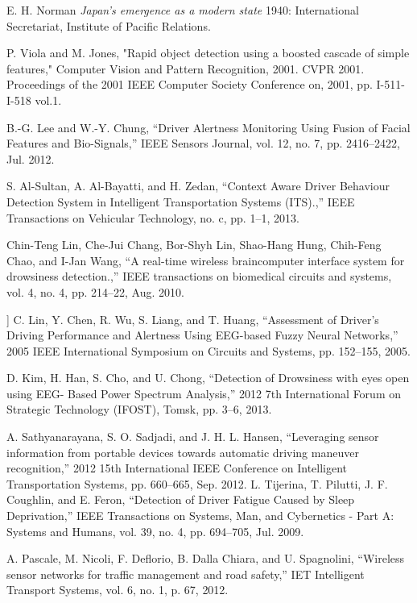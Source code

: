 \documentclass[twocolumn]{article}
\begin{document}
\begin{thebibliography}{1}

   E. H. Norman {\em Japan's emergence as a modern
  state} 1940: International Secretariat, Institute of Pacific
  Relations.

  P. Viola and M. Jones, "Rapid object detection using a boosted cascade of simple features," Computer Vision and Pattern Recognition, 2001. CVPR 2001. Proceedings of the 2001 IEEE Computer Society Conference on, 2001, pp. I-511-I-518 vol.1.
  
   B.-G. Lee and W.-Y. Chung, “Driver Alertness Monitoring Using Fusion of Facial Features and Bio-Signals,” IEEE Sensors Journal, vol. 12, no. 7, pp. 2416–2422, Jul. 2012.
  
   S. Al-Sultan, A. Al-Bayatti, and H. Zedan, “Context Aware Driver Behaviour Detection System in Intelligent Transportation Systems (ITS).,” IEEE Transactions on Vehicular Technology, no. c, pp. 1–1, 2013.

    Chin-Teng Lin, Che-Jui Chang, Bor-Shyh Lin, Shao-Hang Hung, Chih-Feng Chao, and I-Jan Wang, “A real-time wireless braincomputer interface system for drowsiness detection.,” IEEE transactions on biomedical circuits and systems, vol. 4, no. 4, pp. 214–22, Aug. 2010.

	 ] C. Lin, Y. Chen, R. Wu, S. Liang, and T. Huang, “Assessment of Driver’s Driving Performance and Alertness Using EEG-based Fuzzy Neural Networks,” 2005 IEEE International Symposium on Circuits and Systems, pp. 152–155, 2005.

	 D. Kim, H. Han, S. Cho, and U. Chong, “Detection of Drowsiness with eyes open using EEG- Based Power Spectrum Analysis,” 2012 7th International Forum on Strategic Technology (IFOST), Tomsk, pp. 3–6, 2013.

	 A. Sathyanarayana, S. O. Sadjadi, and J. H. L. Hansen, “Leveraging sensor information from portable devices towards automatic driving maneuver recognition,” 2012 15th International IEEE Conference on Intelligent Transportation Systems, pp. 660–665, Sep. 2012.
	 L. Tijerina, T. Pilutti, J. F. Coughlin, and E. Feron, “Detection of Driver Fatigue Caused by Sleep Deprivation,” IEEE Transactions on Systems, Man, and Cybernetics - Part A: Systems and Humans, vol. 39, no. 4, pp. 694–705, Jul. 2009.

	 A. Pascale, M. Nicoli, F. Deflorio, B. Dalla Chiara, and U. Spagnolini, “Wireless sensor networks for traffic management and road safety,” IET Intelligent Transport Systems, vol. 6, no. 1, p. 67, 2012.
    

\end{thebibliography}
\end{document}
